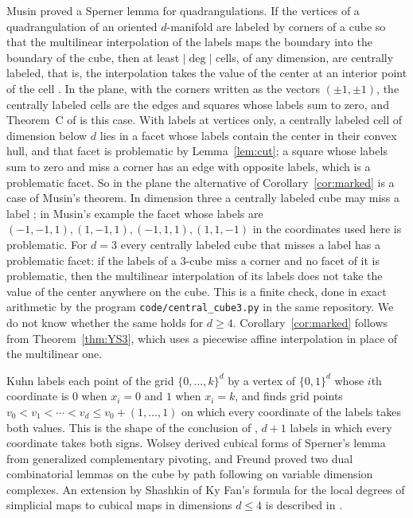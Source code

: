 \documentclass[11pt]{amsart}
\theoremstyle{definition}
\theoremstyle{remark}
\numberwithin{equation}{section}
\begin{document}
Musin \cite{MusinQ} proved a Sperner lemma for quadrangulations. If the vertices of a quadrangulation of an oriented $d$-manifold are labeled by corners of a cube so that the multilinear interpolation of the labels maps the boundary into the boundary of the cube, then at least $|\deg|$ cells, of any dimension, are centrally labeled, that is, the interpolation takes the value of the center at an interior point of the cell \cite[Theorem~1]{MusinQ}. In the plane, with the corners written as the vectors $(\pm1,\pm1)$, the centrally labeled cells are the edges and squares whose labels sum to zero, and Theorem~C of \cite{MusinQ} is this case. With labels at vertices only, a centrally labeled cell of dimension below $d$ lies in a facet whose labels contain the center in their convex hull, and that facet is problematic by Lemma~\ref{lem:cut}; a square whose labels sum to zero and miss a corner has an edge with opposite labels, which is a problematic facet. So in the plane the alternative of Corollary~\ref{cor:marked} is a case of Musin's theorem. In dimension three a centrally labeled cube may miss a label \cite[\S2]{MusinQ}; in Musin's example the facet whose labels are $(-1,-1,1),(1,-1,1),(-1,1,1),(1,1,-1)$ in the coordinates used here is problematic. For $d=3$ every centrally labeled cube that misses a label has a problematic facet: if the labels of a $3$-cube miss a corner and no facet of it is problematic, then the multilinear interpolation of its labels does not take the value of the center anywhere on the cube. This is a finite check, done in exact arithmetic by the program \texttt{code/central\_cube3.py} in the same repository. We do not know whether the same holds for $d\ge4$. Corollary~\ref{cor:marked} follows from Theorem~\ref{thm:YS3}, which uses a piecewise affine interpolation in place of the multilinear one.

Kuhn \cite{Kuhn60} labels each point of the grid $\{0,\ldots,k\}^d$ by a vertex of $\{0,1\}^d$ whose $i$th coordinate is $0$ when $x_i=0$ and $1$ when $x_i=k$, and finds grid points $v_0<v_1<\cdots<v_d\le v_0+(1,\ldots,1)$ on which every coordinate of the labels takes both values. This is the shape of the conclusion of \cite[Theorem~3.4]{GS1}, $d+1$ labels in which every coordinate takes both signs. Wolsey \cite{Wol77} derived cubical forms of Sperner's lemma from generalized complementary pivoting, and Freund \cite{Fre84} proved two dual combinatorial lemmas on the cube by path following on variable dimension complexes. An extension by Shashkin of Ky Fan's formula for the local degrees of simplicial maps to cubical maps in dimensions $d\le4$ is described in \cite[p.~1]{MusinQ}.
\end{document}
